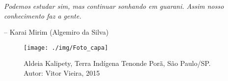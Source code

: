 
\vspace*{\fill}

\epigraph{\emph{Podemos estudar sim, mas continuar sonhando em guarani. Assim nosso conhecimento faz a gente.}}{-- Karai Mirim (Algemiro da Silva)}

\thispagestyle{empty}

\pagebreak

\vspace*{\fill}

\begin{figure}[H]
\begin{adjustwidth}{-2.4cm}{}
  \texttt{[image: ./img/Foto\_capa]}
\end{adjustwidth}
\caption{Aldeia Kalipety, Terra Indígena Tenonde Porã, São Paulo/SP. Autor: Vitor Vieira, 2015}
\end{figure}

\vspace*{\fill}

\thispagestyle{empty}